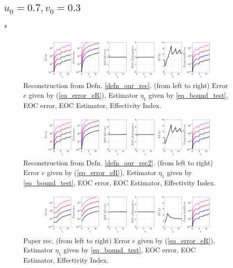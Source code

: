 \documentclass[12pt,a4paper]{article}
\numberwithin{equation}{section}
\theoremstyle{definition}
\begin{document}
\subsection*{$u_0=0.7, v_0= 0.3$}
\/*
\begin{figure}[H]
	\hspace{-3cm}
	\includegraphics[scale=0.55]{fig_LeapFrogplots_1x5_sin_IC_harmonic_order_2_u7_v3_rec_george}	
	\caption{Reconstruction from Defn. \ref{defn_our_rec}. (from left to right) Error $e$ given by (\ref{eq_error_eR}), Estimator $\eta_1$ given by \ref{eq_bound_test},   EOC error, EOC Estimator, Effectivity Index.}
	\label{fig_all_in_one_our_rec_george_u7_v3}
\end{figure}
\begin{figure}[H]
	\hspace{-3cm}
	\includegraphics[scale=0.55]{fig_LeapFrogplots_1x5_sin_IC_harmonic_order_2_u7_v3_rec2}	
	\caption{Reconstruction from Defn. \ref{defn_our_rec2}. (from left to right) Error $e$ given by (\ref{eq_error_eR}), Estimator $\eta_1$ given by \ref{eq_bound_test},   EOC error, EOC Estimator, Effectivity Index.}
	\label{fig_all_in_one_our_rec_2_u7_v3}
\end{figure}
\begin{figure}[H]
	\hspace{-3cm}
	\includegraphics[scale=0.55]{fig_LeapFrogplots_1x5_sin_IC_harmonic_u7_v3_paperrec}	
	\caption{Paper rec. (from left to right) Error $e$ given by (\ref{eq_error_eR}), Estimator $\eta_1$ given by \ref{eq_bound_test},   EOC error, EOC Estimator, Effectivity Index.}
	\label{fig_all_in_one_paperrec_u07_v03}
\end{figure}
\end{document}
